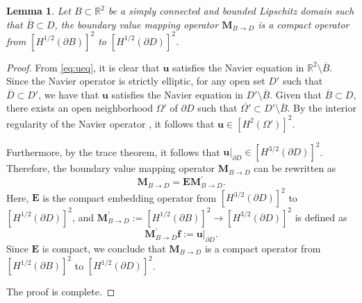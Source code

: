 \documentclass[11pt,reqno,twoside]{amsart}
\newtheorem{lem}{Lemma}[section]
\theoremstyle{definition}
\theoremstyle{remark}
\numberwithin{equation}{section}
\begin{document}
\begin{lem}\label{BoundaryVCompac}
	Let $B \subset \mathbb{R}^2$ be a simply connected and bounded Lipschitz domain such that $\overline{B} \subset D$, the boundary value mapping operator $ \mathbf M_{B \to D}$ is a compact operator from $ \left[H^{1/2}\left(\partial B \right) \right]^2 $ to $\left[H^{1/2}\left(\partial D \right) \right]^2$.
\end{lem}
\begin{proof}
 From \eqref{eq:ueq}, it is clear that $\mathbf{u}$ satisfies the Navier equation in $\mathbb{R}^2 \setminus \overline{B}$. Since the Navier operator is strictly elliptic, for any open set $D'$ such that $\overline{D} \subset D'$, we have that $\mathbf{u}$ satisfies the Navier equation in $D' \setminus \overline{B}$. Given that $\overline{B} \subset D$, there exists an open neighborhood $\Omega'$ of $\partial D$ such that $\overline{\Omega'} \subset D' \setminus \overline{B}$. By the interior regularity of the Navier operator \cite{GT01}, it follows that $\mathbf{u} \in [H^2(\Omega')]^2$.

 
 Furthermore, by the trace theorem, it follows that $\mathbf u |_{\partial D} \in \left[H^{3/2}\left(\partial D \right) \right]^2$. Therefore, the boundary value mapping operator \(\mathbf M_{B \to D}\) can be rewritten as
 $$
 \mathbf M_{B \to D} = \mathbf E \mathbf M^{'}_{B \to D}.
 $$
Here, $\mathbf E$ is the compact embedding operator from $\left[H^{3/2}\left(\partial D \right) \right]^2$ to $\left[H^{1/2}\left(\partial D \right) \right]^2$, and $\mathbf M^{'}_{B \to D} := \left[H^{1/2}\left(\partial B \right) \right]^2 \to \left[H^{3/2}\left(\partial D \right) \right]^2$ is defined as
$$
\mathbf M^{'}_{B \to D} \mathbf f:= \mathbf u |_{\partial D}.
$$
Since $\mathbf{E}$ is compact, we conclude that $\mathbf{M}_{B 	\to D}$ is a compact operator from $[H^{1/2}(\partial B)]^2$ to $[H^{1/2}(\partial D)]^2$. 

The proof is complete.
\end{proof}
\end{document}
